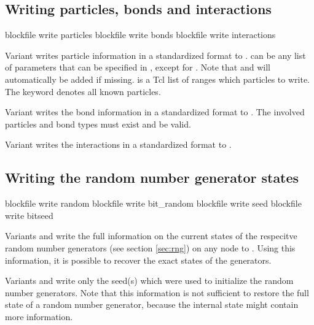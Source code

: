 \subsection{Writing particles, bonds and interactions}
\begin{essyntax}
   blockfile  write particles 
   
   blockfile  write bonds 
   blockfile  write interactions
\end{essyntax}

  Variant  writes
particle information in a standardized format to .
 can be any list of parameters that can be specified in
, except for .  Note that
 and  will automatically be added if missing.
 is a Tcl list of ranges which particles to write.  The
keyword  denotes all known particles.

Variant  writes the bond information in a standardized
format to . The involved particles and bond types must
exist and be valid.

Variant  writes the interactions in a standardized format
to .

\subsection{Writing the random number generator states}
\begin{essyntax}
   blockfile  write random
   blockfile  write bit_random
   blockfile  write seed
   blockfile  write bitseed
\end{essyntax}

Variants  and  write the full information on the
current states of the respecitve random number generators (see section
\vref{sec:rng}) on any node to .  Using this information,
it is possible to recover the exact states of the generators.

Variants  and  write only the seed(s) which were
used to initialize the random number generators. Note that this
information is not sufficient to restore the full state of a random
number generator, because the internal state might contain more
information.

